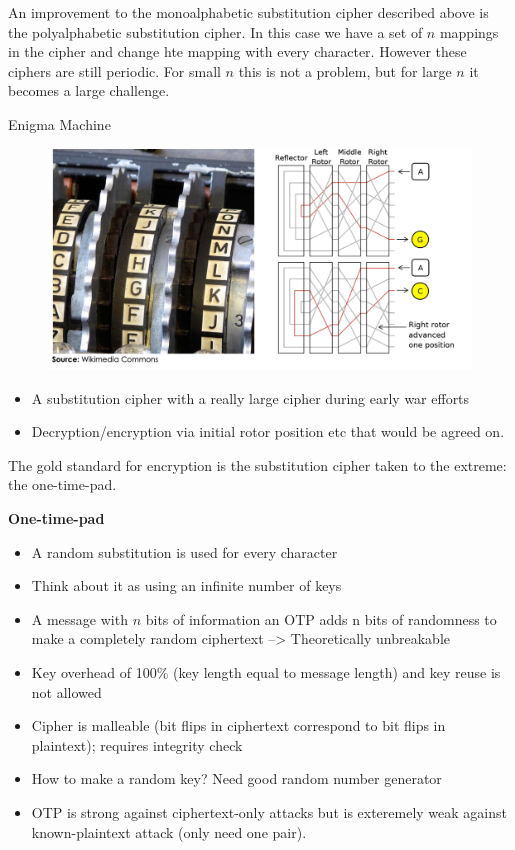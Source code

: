 \documentclass[../notes.tex]{subfiles}
\begin{document}
An improvement to the monoalphabetic substitution cipher described above is the polyalphabetic substitution cipher. In this case we have a set of $ n $ mappings in the cipher and change hte mapping with every character.
However these ciphers are still periodic. For small $ n $ this is not a problem, but for large $ n $ it becomes a large challenge.


\begin{blockquote}
    Enigma Machine
    \begin{figure}[H]
        \centering
        \includegraphics[width=0.8\linewidth]{img/image_2023-01-30-19-30-24.png}
    \end{figure}

    \begin{itemize}
        \item A substitution cipher with a really large cipher during early war efforts
        \item Decryption/encryption via initial rotor position etc that would be agreed on.
    \end{itemize}
\end{blockquote}


The gold standard for encryption is the substitution cipher taken to the extreme: the one-time-pad.

\begin{definition}
    \textbf{One-time-pad}

    \begin{itemize}
        \item A random substitution is used for every character
        \item Think about it as using an infinite number of keys
        \item A message with $ n $ bits of information an OTP adds n bits of randomness to make a completely random ciphertext --> Theoretically unbreakable
        \item Key overhead of 100\% (key length equal to message length) and key reuse is not allowed
        \item Cipher is malleable (bit flips in ciphertext correspond to bit flips in plaintext); requires integrity check
        \item How to make a random key? Need good random number generator
        \item OTP is strong against ciphertext-only attacks but is exteremely weak against known-plaintext attack (only need one pair). 
    \end{itemize}

\end{definition}
\end{document}
